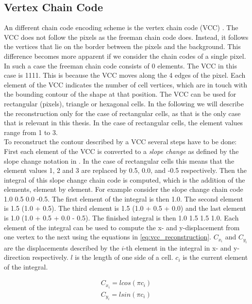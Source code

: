 \documentclass[thesis.tex]{subfiles}
\begin{document}
\subsection{Vertex Chain Code}
An different chain code encoding scheme is the vertex chain code (VCC) \cite{vertex_chain_code}. The VCC does not follow the pixels as the freeman chain code does. Instead, it follows the vertices that lie on the border between the pixels and the background. This difference becomes more apparent if we consider the chain codes of a single pixel. In such a case the freeman chain code consists of 0 elements. The VCC in this case is 1111. This is because the VCC moves along the 4 edges of the pixel. Each element of the VCC indicates the number of cell vertices, which are in touch with the bounding contour of the shape at that position. The VCC can be used for rectangular (pixels), triangle or hexagonal cells. In the following we will describe the reconstruction only for the case of rectangular cells, as that is the only case that is relevant in this thesis. In the case of rectangular cells, the element values range from 1 to 3. \\ To reconstruct the contour described by a VCC several steps have to be done: First each element of the VCC is converted to a \textit{slope change} as defined by the slope change notation in \cite{slope_change_notation}. In the case of rectangular cells this means that the element values 1, 2 and 3 are replaced by 0.5, 0.0, and -0.5 respectively. Then the integral of this slope change chain code is computed, which is the addition of the elements, element by element. For example consider the slope change chain code 1.0 0.5 0.0 -0.5. The first element of the integral is then 1.0. The second element is 1.5 (1.0 + 0.5). The third element is 1.5 (1.0 + 0.5 + 0.0) and the last element is 1.0 (1.0 + 0.5 + 0.0 - 0.5). The finished integral is then 1.0 1.5 1.5 1.0. Each element of the integral can be used to compute the x- and y-displacement from one vertex to the next using the equations in \ref{eq:vcc_reconstruction}. $C_{x_i}$ and $C_{y_i}$ are the displacements described by the $i$-th element in the integral in x- and y-direction respectively. $l$ is the length of one side of a cell. $c_i$ is the current element of the integral. 

\begin{equation} \label{eq:vcc_reconstruction}
\begin{split} 
C_{x_i} = l  cos(\pi c_i) \\
C_{y_i} = l  sin(\pi c_i) \\
\end{split}
\end{equation}
\end{document}
